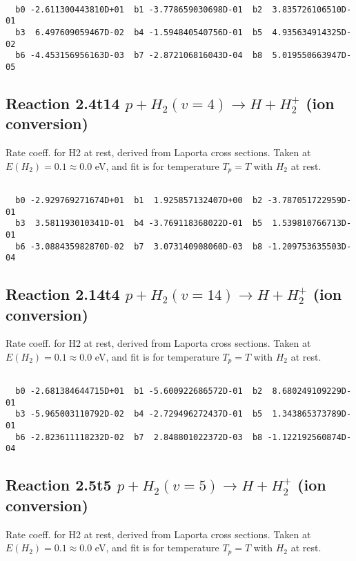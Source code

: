 \begin{small}\begin{verbatim}

  b0 -2.611300443810D+01  b1 -3.778659030698D-01  b2  3.835726106510D-01
  b3  6.497609059467D-02  b4 -1.594840540756D-01  b5  4.935634914325D-02
  b6 -4.453156956163D-03  b7 -2.872106816043D-04  b8  5.019550663947D-05

\end{verbatim}\end{small}

\newpage
\subsection{
Reaction 2.4t14
$ p + H_2(v=4) \rightarrow H + H_2^+$ (ion conversion)
}
Rate coeff. for H2 at rest, derived from Laporta cross sections.
Taken at $E(H_2) = 0.1 \approx 0.0$ eV,  and fit is for temperature $T_p=T$ with $H_2$ at rest.

\begin{small}\begin{verbatim}

  b0 -2.929769271674D+01  b1  1.925857132407D+00  b2 -3.787051722959D-01
  b3  3.581193010341D-01  b4 -3.769118368022D-01  b5  1.539810766713D-01
  b6 -3.088435982870D-02  b7  3.073140908060D-03  b8 -1.209753635503D-04

\end{verbatim}\end{small}

\newpage
\subsection{
Reaction 2.14t4
$ p + H_2(v=14) \rightarrow H + H_2^+$ (ion conversion)
}
Rate coeff. for H2 at rest, derived from Laporta cross sections.
Taken at $E(H_2) = 0.1 \approx 0.0$ eV,  and fit is for temperature $T_p=T$ with $H_2$ at rest.

\begin{small}\begin{verbatim}

  b0 -2.681384644715D+01  b1 -5.600922686572D-01  b2  8.680249109229D-01
  b3 -5.965003110792D-02  b4 -2.729496272437D-01  b5  1.343865373789D-01
  b6 -2.823611118232D-02  b7  2.848801022372D-03  b8 -1.122192560874D-04

\end{verbatim}\end{small}

\newpage
\subsection{
Reaction 2.5t5
$ p + H_2(v=5) \rightarrow H + H_2^+$ (ion conversion)
}
Rate coeff. for H2 at rest, derived from Laporta cross sections.
Taken at $E(H_2) = 0.1 \approx 0.0$ eV,  and fit is for temperature $T_p=T$ with $H_2$ at rest.

